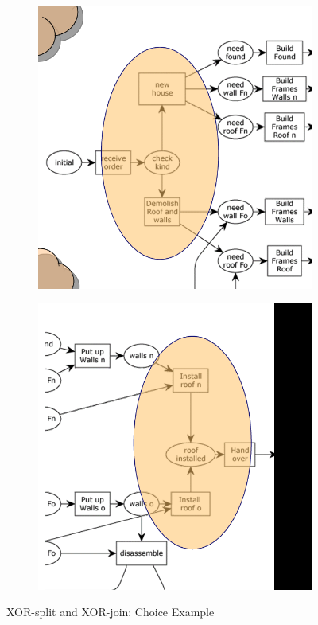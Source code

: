     \begin{figure}[htbp][h]
        \centering
        \begin{subfigure}{\textwidth}
            \includegraphics[scale=0.3]{capitolo 3/3-xor-split-choice.png}
        \end{subfigure}
        \begin{subfigure}{\textwidth}
            \includegraphics[scale=0.3]{capitolo 3/3-xor-join-choice.png}
        \end{subfigure}
        \caption{XOR-split and XOR-join: Choice Example}
    \end{figure}
    
